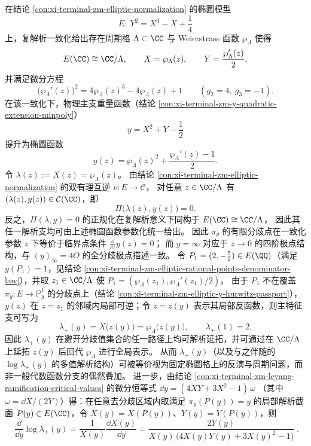 \begin{remark}\label{rem:xi-terminal-zm-lambda-plus-wp-uniformization}
在结论 \ref{con:xi-terminal-zm-elliptic-normalization} 的椭圆模型
\[
E:\ Y^2=X^3-X+\frac14
\]
上，复解析一致化给出存在周期格 \(\Lambda\subset\CC\) 与 Weierstrass 函数 \(\wp_\Lambda\) 使得
\[
E(\CC)\cong \CC/\Lambda,\qquad
X=\wp_\Lambda(z),\qquad
Y=\frac{\wp_\Lambda'(z)}{2},
\]
并满足微分方程
\[
\bigl(\wp_\Lambda'(z)\bigr)^2=4\wp_\Lambda(z)^3-4\wp_\Lambda(z)+1
\qquad(g_2=4,\ g_3=-1).
\]
在该一致化下，物理主支重量函数（结论 \ref{con:xi-terminal-zm-y-quadratic-extension-minpoly}）
\[
y=X^2+Y-\frac12
\]
提升为椭圆函数
\[
y(z)=\wp_\Lambda(z)^2+\frac{\wp_\Lambda'(z)-1}{2}.
\]
令 \(\lambda(z):=X(z)=\wp_\Lambda(z)\)。
由结论 \ref{con:xi-terminal-zm-elliptic-normalization} 的双有理互逆 \(\nu:E\to\mathcal C\)，
对任意 \(z\in\CC/\Lambda\) 有 \((\lambda(z),y(z))\in\mathcal C(\CC)\)，即
\[
\Pi\bigl(\lambda(z),y(z)\bigr)=0.
\]
反之，\(\Pi(\lambda,y)=0\) 的正规化在复解析意义下同构于 \(E(\CC)\cong\CC/\Lambda\)，
因此其任一解析支均可由上述椭圆函数参数化统一给出。
因此 \(\pi_y\) 的有限分歧点在一致化参数 \(z\) 下等价于临界点条件 \(\frac{\dd}{\dd z}y(z)=0\)；
而 \(y=\infty\) 对应于 \(z\to 0\) 的四阶极点结构，与 \((y)_\infty=4O\) 的全分歧极点描述一致。
令 \(P_1=(2,-\tfrac52)\in E(\QQ)\)（满足 \(y(P_1)=1\)，见结论 \ref{con:xi-terminal-zm-elliptic-rational-points-denominator-law}），并取 \(z_1\in\CC/\Lambda\) 使
\(
P_1=(\wp_\Lambda(z_1),\wp_\Lambda'(z_1)/2)
\)。
由于 \(P_1\) 不在覆盖 \(\pi_y:E\to\mathbb P^1_y\) 的分歧点上（结论 \ref{con:xi-terminal-zm-elliptic-y-hurwitz-passport}），
\(y(z)\) 在 \(z=z_1\) 的邻域内局部可逆；令 \(z=z(y)\) 表示其局部反函数，则主特征支可写为
\[
\lambda_+(y)=X\bigl(z(y)\bigr)=\wp_\Lambda\bigl(z(y)\bigr),
\qquad \lambda_+(1)=2.
\]
因此 \(\lambda_+(y)\) 在避开分歧值集合的任一路径上均可解析延拓，并可通过在 \(\CC/\Lambda\) 上延拓 \(z(y)\) 后回代 \(\wp_\Lambda\) 进行全局表示。
从而 \(\lambda_+(y)\)（以及与之伴随的 \(\log\lambda_+(y)\) 的多值解析结构）可被等价视为固定椭圆格上的反演与周期问题，而非一般代数函数分支的偶然叠加。
进一步，由结论 \ref{con:xi-terminal-zm-leyang-ramification-critical-values} 的微分恒等式
\(
\dd y=(4XY+3X^2-1)\,\omega
\)
（其中 \(\omega=\dd X/(2Y)\)）得：在任意去分歧区域内取满足 \(\pi_y(P(y))=y\) 的局部解析截面 \(P(y)\in E(\CC)\)，令
\(
X(y)=X(P(y))
\)、\(
Y(y)=Y(P(y))
\)，则
\[
\boxed{\;
\frac{\dd}{\dd y}\log \lambda_+(y)
=\frac{1}{X(y)}\frac{\dd X(y)}{\dd y}
=\frac{2Y(y)}{X(y)\,\bigl(4X(y)Y(y)+3X(y)^2-1\bigr)}\; }.
\]
\end{remark}
